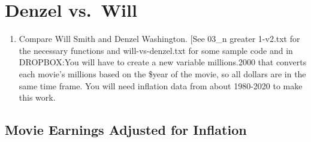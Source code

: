 \documentclass{article}
\providecommand{\tightlist}{%
  \setlength{\itemsep}{0pt}\setlength{\parskip}{0pt}}
\newenvironment{Shaded}{\begin{snugshade}}{\end{snugshade}}
\newcommand{\DataTypeTok}[1]{\textcolor[rgb]{0.13,0.29,0.53}{#1}}
\newcommand{\DecValTok}[1]{\textcolor[rgb]{0.00,0.00,0.81}{#1}}
\newcommand{\KeywordTok}[1]{\textcolor[rgb]{0.13,0.29,0.53}{\textbf{#1}}}
\newcommand{\NormalTok}[1]{#1}
\newcommand{\OperatorTok}[1]{\textcolor[rgb]{0.81,0.36,0.00}{\textbf{#1}}}
\newcommand{\StringTok}[1]{\textcolor[rgb]{0.31,0.60,0.02}{#1}}
\begin{document}
\hypertarget{denzel-vs.-will}{%
\section{Denzel vs.~Will}\label{denzel-vs.-will}}

\begin{enumerate}
\def\labelenumi{\arabic{enumi}.}
\setcounter{enumi}{5}
\tightlist
\item
  Compare Will Smith and Denzel Washington. {[}See 03\_n greater
  1-v2.txt for the necessary functions and will-vs-denzel.txt for some
  sample code and in DROPBOX:You will have to create a new variable
  millions.2000 that converts each movie's millions based on the \$year
  of the movie, so all dollars are in the same time frame. You will need
  inflation data from about 1980-2020 to make this work.
\end{enumerate}

\hypertarget{movie-earnings-adjusted-for-inflation}{%
\subsection{Movie Earnings Adjusted for
Inflation}\label{movie-earnings-adjusted-for-inflation}}

\begin{Shaded}
\end{Shaded}
\end{document}
